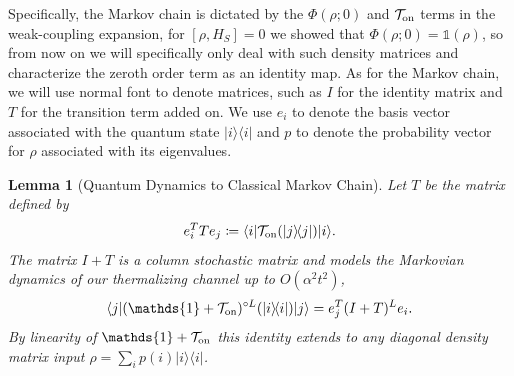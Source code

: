\documentclass{article}
\newtheorem{lemma}[theorem]{Lemma}
\newcommand{\on}{\rm on}
\newcommand{\ket}[1]{|#1\rangle}
\newcommand{\bra}[1]{\langle #1|}
\newcommand{\ketbra}[2]{| #1\rangle\! \langle #2|}
\newcommand{\bigo}[1]{O\left(#1\right)}
\newcommand{\identity}{\mathds{1}}
\begin{document}
Specifically, the Markov chain is dictated by the $\Phi(\rho; 0)$ and $\mathcal{T}_{\on}$ terms in the weak-coupling expansion, for $[\rho, H_S] = 0$ we showed that $\Phi(\rho; 0) = \identity(\rho)$, so from now on we will specifically only deal with such density matrices and characterize the zeroth order term as an identity map. As for the Markov chain, we will use normal font to denote matrices, such as $I$ for the identity matrix and $T$ for the transition term added on. We use $e_i$ to denote the basis vector associated with the quantum state $\ketbra{i}{i}$ and $p$ to denote the probability vector for $\rho$ associated with its eigenvalues.
\begin{lemma}[Quantum Dynamics to Classical Markov Chain] \label{lem:quantum_to_classical}
    Let $T$ be the matrix defined by 
    \begin{equation}
        e_i^T T e_j \coloneqq \bra{i} \mathcal{T}_{\on}(\ketbra{j}{j}) \ket{i}.
    \end{equation}
    The matrix $I + T$ is a column stochastic matrix and models the Markovian dynamics of our thermalizing channel up to $\bigo{\alpha^2 t^2}$,
    \begin{equation}
        \bra{j} (\identity + \mathcal{T}_{\on})^{\circ L} (\ketbra{i}{i}) \ket{j} = e_j^T (I + T)^L e_i.
    \end{equation}
    By linearity of $\identity + \mathcal{T}_{\on}$ this identity extends to any diagonal density matrix input $\rho = \sum_i p(i) \ketbra{i}{i}$.
\end{lemma}
\end{document}
